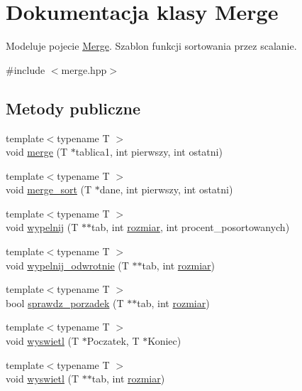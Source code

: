 \hypertarget{class_merge}{\section{\-Dokumentacja klasy \-Merge}
\label{class_merge}
}


\-Modeluje pojecie \hyperlink{class_merge}{\-Merge}. \-Szablon funkcji sortowania przez scalanie.  




{\ttfamily \#include $<$merge.\-hpp$>$}

\subsection*{\-Metody publiczne}
\begin{DoxyCompactItemize}
\item 
{\footnotesize template$<$typename T $>$ }\\void \hyperlink{class_merge_a4988abdfdf2abb6b412934bb4c16c80f}{merge} (\-T $\ast$tablica1, int pierwszy, int ostatni)
\item 
{\footnotesize template$<$typename T $>$ }\\void \hyperlink{class_merge_ae0fee8fd920f1abd9c903793a98a6de2}{merge\-\_\-sort} (\-T $\ast$dane, int pierwszy, int ostatni)
\item 
{\footnotesize template$<$typename T $>$ }\\void \hyperlink{class_merge_ae554c22c5112a15381137978188dd3bb}{wypelnij} (\-T $\ast$$\ast$tab, int \hyperlink{sort__benchmark_8cpp_a7a94022ad844ead66e9b80459dabdb02}{rozmiar}, int procent\-\_\-posortowanych)
\item 
{\footnotesize template$<$typename T $>$ }\\void \hyperlink{class_merge_adaf2a19ed0f9d1e91fa7fc383c51ea8f}{wypelnij\-\_\-odwrotnie} (\-T $\ast$$\ast$tab, int \hyperlink{sort__benchmark_8cpp_a7a94022ad844ead66e9b80459dabdb02}{rozmiar})
\item 
{\footnotesize template$<$typename T $>$ }\\bool \hyperlink{class_merge_a123099309cb142028d6c2d4a0ea66571}{sprawdz\-\_\-porzadek} (\-T $\ast$$\ast$tab, int \hyperlink{sort__benchmark_8cpp_a7a94022ad844ead66e9b80459dabdb02}{rozmiar})
\item 
{\footnotesize template$<$typename T $>$ }\\void \hyperlink{class_merge_ab3245c1b49bd123cf24a8168f718775e}{wyswietl} (\-T $\ast$\-Poczatek, \-T $\ast$\-Koniec)
\item 
{\footnotesize template$<$typename T $>$ }\\void \hyperlink{class_merge_a8cbad74164adfdfd8fc922b174885cd1}{wyswietl} (\-T $\ast$$\ast$tab, int \hyperlink{sort__benchmark_8cpp_a7a94022ad844ead66e9b80459dabdb02}{rozmiar})
\end{DoxyCompactItemize}


